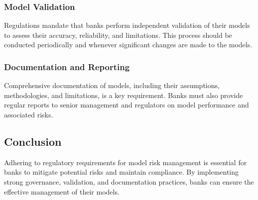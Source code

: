 \subsubsection{Model Validation}
Regulations mandate that banks perform independent validation of their models to assess their accuracy, reliability, and limitations. This process should be conducted periodically and whenever significant changes are made to the models.

\subsubsection{Documentation and Reporting}
Comprehensive documentation of models, including their assumptions, methodologies, and limitations, is a key requirement. Banks must also provide regular reports to senior management and regulators on model performance and associated risks.

\subsection{Conclusion}
Adhering to regulatory requirements for model risk management is essential for banks to mitigate potential risks and maintain compliance. By implementing strong governance, validation, and documentation practices, banks can ensure the effective management of their models.